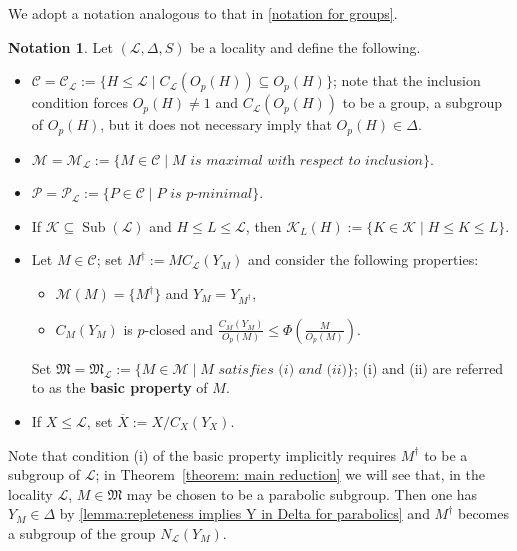 \documentclass{amsart}
\numberwithin{equation}{section}
\theoremstyle{definition}
\newtheorem{notation}[equation]{Notation}
\theoremstyle{subresult}
\theoremstyle{caseresult}
\newcommand{\M}{\mathcal{M}}
\newcommand{\gM}{\mathfrak{M}}
\renewcommand{\L}{\mathcal{L}}
\newcommand{\C}{\mathcal{C}}
\newcommand{\K}{\mathcal{K}}
\renewcommand{\P}{\mathcal{P}}
\newcommand{\Sub}{\operatorname{Sub}}
\newcommand{\ov}{\overline}
\newcommand{\<}{\langle}
\renewcommand{\>}{\rangle}
\begin{document}
We adopt a notation analogous to that in \ref{notation for groups}.
\begin{notation}\label{notation for localities}
Let $(\L, \Delta,S)$ be a locality and define the following.
	\begin{itemize}
		\item $\C = \C_\L := \{H \le \L \mid C_\L(O_p(H)) \subseteq O_p(H) \}$; note that the inclusion condition forces $O_p(H) \ne 1$ and $C_\L(O_p(H))$ to be a group, a subgroup of $O_p(H)$, but it does not necessary imply that $O_p(H) \in \Delta$.
		\item $\M = \M_\L := \{ M \in \C \mid \textit{$M$ is maximal with respect to inclusion} \}$.
		\item $\P = \P_\L := \{ P \in \C \mid \textit{$P$ is $p$-minimal} \}$.
		\item If $\K \subseteq \Sub(\L)$ and $H \le L \le \L$, then $\K_L(H) := \{ K \in \K \mid H \le K \le L \}$.
		\item Let $M \in \C$; set $M^\dagger :=MC_\L(Y_M)$ and consider the following properties:
			\begin{itemize}
				\item[(i)] $\M(M) = \{M^\dagger\}$ and $Y_M = Y_{M^\dagger}$,
				\item[(ii)] $C_M(Y_M)$ is $p$-closed and $\displaystyle \frac{C_M(Y_M)}{O_p(M)} \le \Phi \left( \frac{M}{O_p(M)} \right)$.
			\end{itemize}
			Set $\gM = \gM_\L := \{ M \in \M \mid \textit{$M$ satisfies (i) and (ii)} \}$; (i) and (ii) are referred to as the {\bf basic property} of $M$.
        \item If $X \le \L$, set $\ov{X} := X / C_X(Y_X)$.
	\end{itemize}
\end{notation}
Note that condition (i) of the basic property implicitly requires $M^\dagger$ to be a subgroup of $\L$; in Theorem~\ref{theorem: main reduction} we will see that, in the locality $\L$, $M \in \gM$ may be chosen to be a parabolic subgroup. Then one has $Y_M \in \Delta$ by \ref{lemma:repleteness implies Y in Delta for parabolics} and $M^\dagger$ becomes a subgroup of the group $N_\L(Y_M)$.
\end{document}
